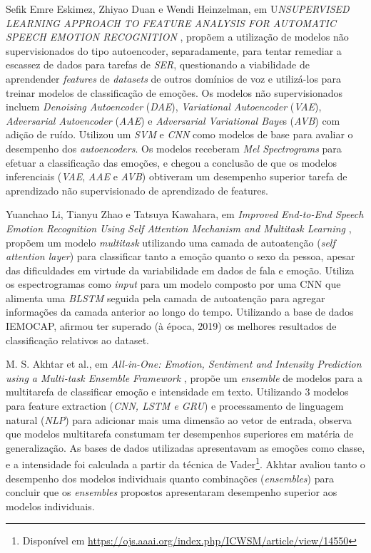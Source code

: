 Sefik Emre Eskimez, Zhiyao Duan e Wendi Heinzelman, em U\textit{NSUPERVISED LEARNING APPROACH TO FEATURE ANALYSIS FOR AUTOMATIC SPEECH EMOTION RECOGNITION} \cite{34}, propõem a utilização de modelos não supervisionados do tipo autoencoder, separadamente, para tentar remediar a escassez de dados para tarefas de \textit{SER}, questionando a viabilidade de aprendender \textit{features} de \textit{datasets} de outros domínios de voz e utilizá-los para treinar modelos de classificação de emoções. Os modelos não supervisionados incluem\textit{ Denoising Autoencoder} (\textit{DAE}), \textit{Variational Autoencoder} (\textit{VAE}), \textit{Adversarial Autoencoder} (\textit{AAE}) e \textit{Adversarial Variational Baye}s (\textit{AVB}) com adição de ruído. Utilizou um \textit{SVM} e \textit{CNN} como modelos de base para avaliar o desempenho dos \textit{autoencoders}. Os modelos receberam\textit{ Mel Spectrograms} para efetuar a classificação das emoções, e \cite{34} chegou a conclusão de que os modelos inferenciais (\textit{VAE}, \textit{AAE} e \textit{AVB}) obtiveram um desempenho superior tarefa de aprendizado não supervisionado de aprendizado de features.

Yuanchao Li, Tianyu Zhao e Tatsuya Kawahara, em \textit{Improved End-to-End Speech Emotion Recognition Using Self Attention Mechanism and Multitask Learning} \cite{32.95}, propõem um modelo \textit{multitask} utilizando uma camada de autoatenção (\textit{self attention layer}) para classificar tanto a emoção quanto o sexo da pessoa, apesar das dificuldades em virtude da variabilidade em dados de fala e emoção. Utiliza os espectrogramas como \textit{input} para um modelo composto por uma CNN\textit{ }que alimenta uma \textit{BLSTM} seguida pela camada de autoatenção para agregar informações da camada anterior ao longo do tempo. Utilizando a base de dados IEMOCAP, afirmou ter superado (à época, 2019) os melhores resultados de classificação relativos ao dataset.

M. S. Akhtar et al., em \textit{All-in-One: Emotion, Sentiment and Intensity Prediction using a Multi-task Ensemble Framework} \cite{28}, propõe um \textit{ensemble} de modelos para a multitarefa de classificar emoção e intensidade em texto. Utilizando 3 modelos para feature extraction (\textit{\textit{CNN, \textit{LSTM} e GRU}}) e processamento de linguagem natural (\textit{NLP}) para adicionar mais uma dimensão ao vetor de entrada, observa que modelos multitarefa constumam ter desempenhos superiores em matéria de generalização. As bases de dados utilizadas apresentavam as emoções como classe, e a intensidade foi calculada a partir da técnica de Vader\footnote{Disponível em \url{https://ojs.aaai.org/index.php/ICWSM/article/view/14550}}. Akhtar avaliou tanto o desempenho dos modelos individuais quanto combinações (\textit{ensembles}) para concluir que os \textit{ensembles} propostos apresentaram desempenho superior aos modelos individuais.

